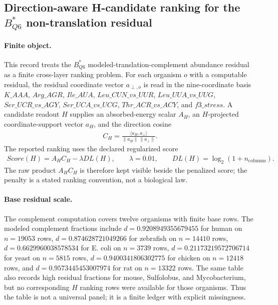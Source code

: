 \subsection{Direction-aware H-candidate ranking for the $B^*_{Q6}$ non-translation residual}
\label{sec:q6-h-ranking-table-direction-aware-cross-layer}

\paragraph{Finite object.}
This record treats the $B^*_{Q6}$ modeled-translation-complement abundance residual as a finite cross-layer ranking problem.  For each organism $o$ with a computable residual, the residual coordinate vector $a_{\perp,o}$ is read in the nine-coordinate basis
$K\_AAA$, $Arg\_AGR$, $Ile\_AUA$, $Leu\_CUN\_vs\_UUR$, $Leu\_UUA\_vs\_UUG$, $Ser\_UCR\_vs\_AGY$, $Ser\_UCA\_vs\_UCG$, $Thr\_ACR\_vs\_ACY$, and $f3\_stress$.  A candidate readout $H$ supplies an absorbed-energy scalar $A_H$, an $H$-projected coordinate-support vector $a_H$, and the direction cosine
$$
\begin{aligned}
C_H = \frac{\langle a_H,a_{\perp}\rangle}{\lVert a_H\rVert\,\lVert a_{\perp}\rVert}.
\end{aligned}
$$
The reported ranking uses the declared regularized score
$$
\begin{aligned}
Score(H) = A_H C_H - \lambda DL(H), \qquad \lambda=0.01, \qquad DL(H)=\log_2(1+n_{\mathrm{columns}}).
\end{aligned}
$$
The raw product $A_H C_H$ is therefore kept visible beside the penalized score; the penalty is a stated ranking convention, not a biological law.

\paragraph{Base residual scale.}
The complement computation covers twelve organisms with finite base rows.  The modeled complement fractions include $d=0.9208949355679455$ for human on $n=19053$ rows, $d=0.874628721049266$ for zebrafish on $n=14410$ rows, $d=0.6629960038578534$ for E. coli on $n=3739$ rows, $d=0.21173219572706714$ for yeast on $n=5815$ rows, $d=0.9400341806302775$ for chicken on $n=12418$ rows, and $d=0.9573445453007974$ for rat on $n=13322$ rows.  The same table also records high residual fractions for mouse, Sulfolobus, and Mycobacterium, but no corresponding $H$ ranking rows were available for those organisms.  Thus the table is not a universal panel; it is a finite ledger with explicit missingness.

